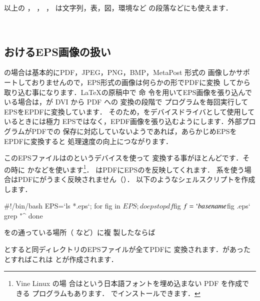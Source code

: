 以上の ， ， ，
 は文字列，表，図，環境など
の段落などにも使えます．%
\begin{InOut}
\newcommand{\testtab}{%
\begin{tabular}{|c|}
 \hline \LaTeX\\ \LaTeXe \\ \hline
\end{tabular}}
\rotatebox{80}{\testtab}~
\reflectbox{\testtab}
\end{InOut}

\subsection{\texorpdfstring{} におけるEPS画像の扱い}

\Dvipdfmx の場合は基本的にPDF，JPEG，PNG，BMP，MetaPost 形式の
画像しかサポートしておりませんので，EPS形式の画像は何らかの形でPDFに変換
してから取り込む事になります．\LaTeX の原稿中で 命
令を用いてEPS画像を張り込んでいる場合は，\Dvipdfmx が DVI から PDF への
変換の段階で \GS プログラムを毎回実行してEPSをEPDFに変換しています．
そのため，\Dvipdfmx をデバイスドライバとして使用しているときには極力
EPSではなく，EPDF画像を張り込むようにします．外部プログラムがPDFでの
保存に対応していないようであれば，あらかじめEPSをEPDFに変換すると
処理速度の向上につながります．

このEPSファイルはのというデバイスを使って
変換する事がほとんどです．その時に
かなどを使います\footnote{Vine Linux の場
合はという日本語フォントを埋め込まない PDF を作成できる
プログラムもあります．
でインストールできます．}．
はPDFにEPSの{\BB}を反映してくれます．
系を使う場合はPDFに{\BB}がうまく反映されません（\genzai）．
以下のようなシェルスクリプトを作成します．

\begin{InText}
#!/bin/bash
EPS=`ls *.eps`;
for fig in $EPS; do
   epstopdf $fig
   $f=`basename $fig .eps`
   grep "^%
done
\end{InText}

をの通っている場所（ など）に複
製したならば
\begin{InTerm}
\end{InTerm}
とすると同ディレクトリのEPSファイルが全てPDFに
変換されます．があったとすればこれは
とが作成されます．


